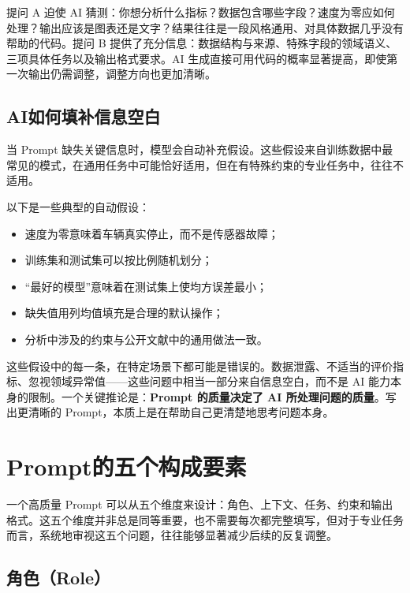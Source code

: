 提问 A 迫使 AI 猜测：你想分析什么指标？数据包含哪些字段？速度为零应如何处理？输出应该是图表还是文字？结果往往是一段风格通用、对具体数据几乎没有帮助的代码。提问 B 提供了充分信息：数据结构与来源、特殊字段的领域语义、三项具体任务以及输出格式要求。AI 生成直接可用代码的概率显著提高，即使第一次输出仍需调整，调整方向也更加清晰。

\subsection{AI如何填补信息空白}

当 Prompt 缺失关键信息时，模型会自动补充假设。这些假设来自训练数据中最常见的模式，在通用任务中可能恰好适用，但在有特殊约束的专业任务中，往往不适用。

以下是一些典型的自动假设：

\begin{itemize}
  \item 速度为零意味着车辆真实停止，而不是传感器故障；
  \item 训练集和测试集可以按比例随机划分；
  \item“最好的模型”意味着在测试集上使均方误差最小；
  \item 缺失值用列均值填充是合理的默认操作；
  \item 分析中涉及的约束与公开文献中的通用做法一致。
\end{itemize}

这些假设中的每一条，在特定场景下都可能是错误的。数据泄露、不适当的评价指标、忽视领域异常值——这些问题中相当一部分来自信息空白，而不是 AI 能力本身的限制。一个关键推论是：\textbf{Prompt 的质量决定了 AI 所处理问题的质量}。写出更清晰的 Prompt，本质上是在帮助自己更清楚地思考问题本身。

\section{Prompt的五个构成要素}

一个高质量 Prompt 可以从五个维度来设计：角色、上下文、任务、约束和输出格式。这五个维度并非总是同等重要，也不需要每次都完整填写，但对于专业任务而言，系统地审视这五个问题，往往能够显著减少后续的反复调整。

\subsection{角色（Role）}

